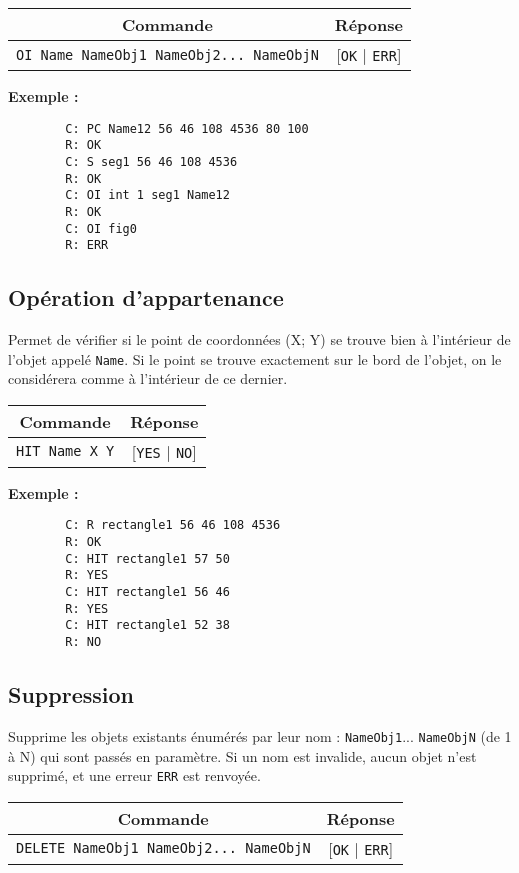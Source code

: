 \documentclass[11pt,a4paper]{article}
\begin{document}
	\begin{center}
		\begin{tabular}[c]{|c | c|}
			\hline
			\textbf{Commande} & \textbf{Réponse} \\
			\hline
			\texttt{OI Name NameObj1 NameObj2... NameObjN} & [\texttt{OK} | \texttt{ERR}] \\
			\hline
		\end{tabular}
	\end{center}
	
	\textbf{Exemple :}
	\begin{verbatim}
		C: PC Name12 56 46 108 4536 80 100
		R: OK
		C: S seg1 56 46 108 4536
		R: OK
		C: OI int 1 seg1 Name12
		R: OK
		C: OI fig0
		R: ERR
	\end{verbatim}
	
	\subsection{Opération d'appartenance}
	Permet de vérifier si le point de coordonnées (X; Y) se trouve bien à l'intérieur de l'objet appelé \texttt{Name}. Si le point se trouve exactement sur le bord de l’objet, on le considérera comme à l’intérieur de ce dernier.
	
	\begin{center}
		\begin{tabular}[c]{|c | c|}
			\hline
			\textbf{Commande} & \textbf{Réponse} \\
			\hline
			\texttt{HIT Name X Y} & [\texttt{YES} | \texttt{NO}] \\
			\hline
		\end{tabular}
	\end{center}
	
	\textbf{Exemple :}
	\begin{verbatim}
		C: R rectangle1 56 46 108 4536
		R: OK
		C: HIT rectangle1 57 50
		R: YES
		C: HIT rectangle1 56 46
		R: YES
		C: HIT rectangle1 52 38
		R: NO
	\end{verbatim}
	
	\subsection{Suppression}
	Supprime les objets existants énumérés par leur nom : \texttt{NameObj1}... \texttt{NameObjN} (de 1 à N) qui sont passés en paramètre. Si un nom est invalide, aucun objet n'est supprimé, et une erreur \texttt{ERR} est renvoyée.
	
	\begin{center}
		\begin{tabular}[c]{|c | c|}
			\hline
			\textbf{Commande} & \textbf{Réponse} \\
			\hline
			\texttt{DELETE NameObj1 NameObj2... NameObjN} & [\texttt{OK} | \texttt{ERR}] \\
			\hline
		\end{tabular}
	\end{center}
	
\end{document}
